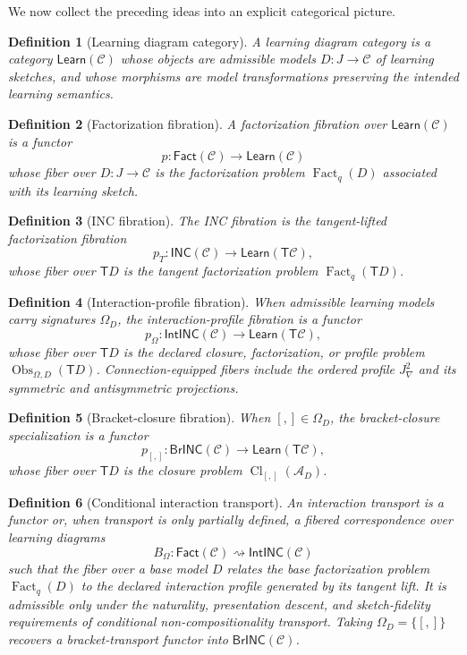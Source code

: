\documentclass{article}
\newtheorem{definition}{Definition}
\newcommand{\C}{\mathcal{C}}
\newcommand{\T}{\mathsf{T}}
\newcommand{\Fact}{\operatorname{Fact}}
\newcommand{\Cl}{\operatorname{Cl}}
\newcommand{\Obs}{\operatorname{Obs}}
\begin{document}
We now collect the preceding ideas into an explicit categorical picture.

\begin{definition}[Learning diagram category]
A learning diagram category is a category \(\mathsf{Learn}(\C)\) whose objects are admissible models \(D:J\to\C\) of learning sketches, and whose morphisms are model transformations preserving the intended learning semantics.
\end{definition}

\begin{definition}[Factorization fibration]
A factorization fibration over \(\mathsf{Learn}(\C)\) is a functor
\[
p:\mathsf{Fact}(\C)\to\mathsf{Learn}(\C)
\]
whose fiber over \(D:J\to\C\) is the factorization problem \(\Fact_q(D)\) associated with its learning sketch.
\end{definition}

\begin{definition}[INC fibration]
The INC fibration is the tangent-lifted factorization fibration
\[
p_T:\mathsf{INC}(\C)\to\mathsf{Learn}(\T\C),
\]
whose fiber over \(\T D\) is the tangent factorization problem \(\Fact_q(\T D)\).
\end{definition}

\begin{definition}[Interaction-profile fibration]
When admissible learning models carry signatures $\Omega_D$, the
interaction-profile fibration is a functor
\[
p_\Omega:\mathsf{IntINC}(\C)\to\mathsf{Learn}(\T\C),
\]
whose fiber over $\T D$ is the declared closure, factorization, or profile
problem $\Obs_{\Omega,D}(\T D)$.  Connection-equipped fibers include the
ordered profile $J^2_\nabla$ and its symmetric and antisymmetric projections.
\end{definition}

\begin{definition}[Bracket-closure fibration]
When $[,]\in\Omega_D$, the bracket-closure specialization is a functor
\[
p_{[,]}:\mathsf{BrINC}(\C)\to\mathsf{Learn}(\T\C),
\]
whose fiber over \(\T D\) is the closure problem
\(\Cl_{[,]}(\mathcal A_D)\).
\end{definition}

\begin{definition}[Conditional interaction transport]
An interaction transport is a functor or, when transport is only partially
defined, a fibered correspondence over learning diagrams
\[
B_\Omega:\mathsf{Fact}(\C)\rightsquigarrow\mathsf{IntINC}(\C)
\]
such that the fiber over a base model $D$ relates the base factorization
problem $\Fact_q(D)$ to the declared interaction profile generated by its
tangent lift.  It is admissible only under the naturality, presentation
descent, and sketch-fidelity requirements of conditional
non-compositionality transport.  Taking $\Omega_D=\{[,]\}$ recovers a
bracket-transport functor into $\mathsf{BrINC}(\C)$.
\end{definition}
\end{document}
